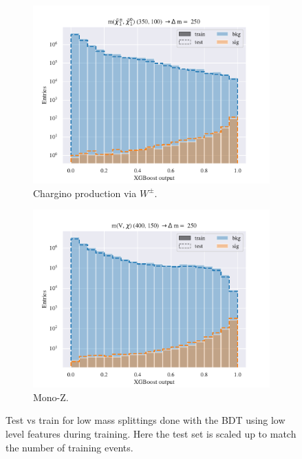 \begin{figure}[H]
    \begin{subfigure}[t!]{0.49\textwidth}
        \includegraphics[width = \textwidth]{Figures/WW/BDT/Low_level/Inter/scaled_train_test_395320.pdf}
        \caption{Chargino production via $W^\pm$.}
        \label{fig:}
    \end{subfigure}
    \begin{subfigure}[t!]{0.49\textwidth}
        \includegraphics[width = \textwidth]{Figures/Mono_Z/ML/BDT/Low_level/Inter/scaled_train_test_310613.pdf}
        \caption{Mono-Z.}
        \label{fig:}
    \end{subfigure}
    \caption{Test vs train for low mass splittings done with the BDT using low level features during training. Here the test set is scaled up to match the number of training events.}
    \label{fig:Non}
\end{figure}



